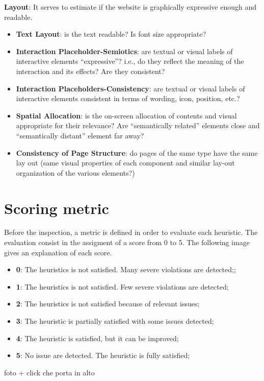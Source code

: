 \textbf{Layout}: It serves to estimate if the website is graphically expressive enough and readable.
\begin{itemize}
\item \textbf{Text Layout}: is the text readable? Is font size appropriate?
\item \textbf{Interaction Placeholder-Semiotics}: are textual or visual labels of interactive elements “expressive”? i.e., do they reflect the meaning of the interaction and its effects? Are they consistent?
\item \textbf{Interaction Placeholders-Consistency}: are textual or visual labels of interactive elements consistent in terms of wording, icon, position, etc.?
\item \textbf{Spatial Allocation}: is the on-screen allocation of contents and visual appropriate for their relevance? Are “semantically related” elements close and “semantically distant” element far away?
\item \textbf{Consistency of Page Structure}: do pages of the same type have the same lay out (same visual properties of each component and similar lay-out organization of the various elements?)
\end{itemize} 


\section{Scoring metric}
Before the inspection, a metric is defined in order to evaluate each heuristic. The evaluation consist in the assigment of a score from 0 to 5. The following image gives an explanation of each score.

\begin{itemize}
\item \textbf{0}: The heuristics is not satisfied. Many severe violations are detected;;
\item \textbf{1}: The heuristics is not satisfied. Few severe violations are detected;
\item \textbf{2}: The heuristics is not satisfied because of relevant issues;
\item \textbf{3}: The heuristic is partially satisfied with some issues detected;
\item \textbf{4}: The heuristic is satisfied, but it can be improved;
\item \textbf{5}: No issue are detected. The heuristic is fully satisfied; 
\end{itemize}


foto + click che porta in alto